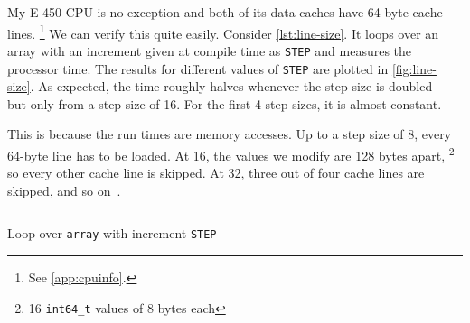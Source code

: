 My E-450 CPU is no exception and both of its data caches have 64-byte cache lines.%
\footnote{See \cref{app:cpuinfo}.}
We can verify this quite easily.  Consider \cref{lst:line-size}.  It loops over an array
with an increment given at compile time as \texttt{STEP} and measures the processor time.
The results for different values of \texttt{STEP} are plotted in \cref{fig:line-size}.
As expected, the time roughly halves whenever the step size is doubled --- but only from a
step size of 16.  For the first 4 step sizes, it is almost constant.

This is because the run times are  memory accesses.
Up to a step size of 8, every 64-byte line has to be loaded.  At 16, the values we modify
are 128 bytes apart,%
\footnote{16 \texttt{int64\_t} values of 8 bytes each}
so every other cache line is skipped.  At 32, three out of four cache lines are skipped,
and so on~\cite[cf.][example 2]{gallery}.

\begin{listing}
   \inputminted[firstline=27]{c}{line-size/line-size.c}
   \caption{Loop over \texttt{array} with increment \texttt{STEP}}
   \label{lst:line-size}
\end{listing}

